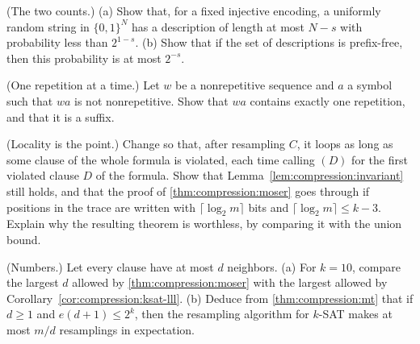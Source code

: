 \begin{refsection}
\begin{exercises}
\item\label{ex:compression:kraft} \consolidation (The two counts.) (a) Show that, for a fixed injective encoding, a uniformly random string in $\{0,1\}^N$ has a description of length at most $N-s$ with probability less than $2^{1-s}$. (b) Show that if the set of descriptions is prefix-free, then this probability is at most $2^{-s}$. 

\item\label{ex:compression:unique} \consolidation (One repetition at a time.) Let $w$ be a nonrepetitive sequence and $a$ a symbol such that $wa$ is not nonrepetitive. Show that $wa$ contains exactly one repetition, and that it is a suffix. 

\item\label{ex:compression:global} \consolidation (Locality is the point.) Change \compressionFix{} so that, after resampling $C$, it loops as long as some clause of the whole formula is violated, each time calling \compressionFix$(D)$ for the first violated clause $D$ of the formula. Show that Lemma~\ref{lem:compression:invariant} still holds, and that the proof of \cref{thm:compression:moser} goes through if positions in the trace are written with $\lceil\log_2m\rceil$ bits and $\lceil\log_2m\rceil\le k-3$. Explain why the resulting theorem is worthless, by comparing it with the union bound.

\item\label{ex:compression:numbers} \consolidation (Numbers.) Let every clause have at most $d$ neighbors. (a) For $k=10$, compare the largest $d$ allowed by \cref{thm:compression:moser} with the largest allowed by Corollary~\ref{cor:compression:ksat-lll}. (b) Deduce from \cref{thm:compression:mt} that if $d\ge1$ and $e(d+1)\le2^k$, then the resampling algorithm for $k$-SAT makes at most $m/d$ resamplings in expectation.


\end{exercises}
\end{refsection}
